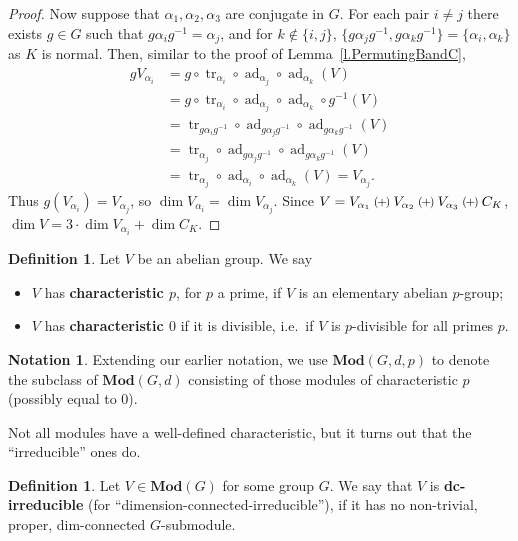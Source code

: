 \documentclass[a4paper, 11pt]{amsart}
\theoremstyle{plain}
\theoremstyle{definition}
\newtheorem{definition}[theorem]{Definition}
\newtheorem*{notation}{Notation}
\theoremstyle{remark}
\newcommand{\qoplus}{\mathbin{\scalerel*{\left(\mkern-2mu+\mkern-2mu\right)}{\bigcirc}}}
\DeclareMathOperator{\ad}{ad}
\DeclareMathOperator{\tr}{tr}
\newcommand{\Mod}{\mathbf{Mod}}
\begin{document}
\begin{proof}
Now suppose that $\alpha_{1},\alpha_{2},\alpha_{3}$ are conjugate in $G$. For each  pair $i\neq j$ there exists $g\in G$ such that $g\alpha_{i}g^{-1}=\alpha_{j}$, and for $k\notin\{i,j\}$, $\{g\alpha_{j}g^{-1},g\alpha_{k}g^{-1}\} = \{\alpha_i,\alpha_k\}$ as $K$ is normal.
Then, similar to the proof of Lemma~\ref{l.PermutingBandC}, 
\begin{align*}
gV_{\alpha_{i}} & =g\circ\tr_{\alpha_{i}}\circ\ad_{\alpha_{j}}\circ\ad_{\alpha_{k}}(V)\\
& =g\circ\tr_{\alpha_{i}}\circ\ad_{\alpha_{j}}\circ\ad_{\alpha_{k}}\circ g^{-1}(V)\\
& =\tr_{g\alpha_{i}g^{-1}}\circ\ad_{g\alpha_{j}g^{-1}}\circ\ad_{g\alpha_{k}g^{-1}}(V)\\
& =\tr_{\alpha_{j}}\circ\ad_{g\alpha_{j}g^{-1}}\circ\ad_{g\alpha_{k}g^{-1}}(V)\\
 & =\tr_{\alpha_{j}}\circ\ad_{\alpha_{i}}\circ\ad_{\alpha_{k}}(V)=V_{\alpha_{j}}.
\end{align*}
Thus $g(V_{\alpha_{i}})=V_{\alpha_{j}}$, so $\dim V_{\alpha_{i}} = \dim V_{\alpha_{j}}$.  Since $V=V_{\alpha_{1}}\qoplus V_{\alpha_{2}}\qoplus V_{\alpha_{3}}\qoplus C_{K}$, 
$\dim V=3\cdot\dim V_{\alpha_{i}}+\dim C_{K}$.
\end{proof}

\begin{definition}\label{d.Characteristic}
Let $V$ be an abelian group. We say
\begin{itemize}
\item
 $V$ has \textbf{characteristic $p$}, for $p$ a prime, if $V$ is an elementary abelian $p$-group;
\item
$V$ has \textbf{characteristic $0$} if it is divisible, i.e.~if $V$ is $p$-divisible  for all primes $p$.
\end{itemize}
\end{definition}

\begin{notation}
Extending our earlier notation, we use $\Mod(G, d, p)$ to denote the subclass of $\Mod(G, d)$ consisting of those modules of characteristic $p$ (possibly equal to $0$).
\end{notation}

Not all modules have a well-defined characteristic, but it turns out that the ``irreducible'' ones do.

\begin{definition}\label{d.Irreducible}
Let $V\in \Mod(G)$ for some group $G$. We say that $V$ is \textbf{dc-irreducible} (for ``dimension-connected-irreducible''), if it has no non-trivial, proper, dim-connected $G$-submodule.
\end{definition}
\end{document}

